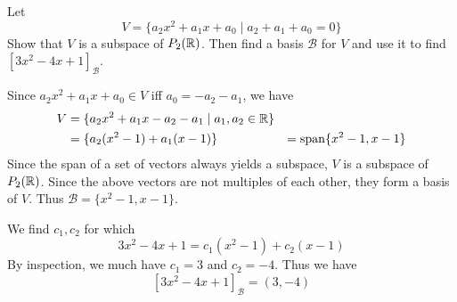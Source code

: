 \documentclass{article}
\DeclareMathOperator{\spn}{span}
\begin{document}
\begin{example}
  Let \[
    V = \{a_2x^2 + a_1x + a_0 \mid a_2 + a_1 + a_0 = 0\}
  \]
  Show that $V$ is a subspace of $P_2(\mathbb{R})$. Then find a basis $\mathcal{B}$ for $V$ and use it to find $[3x^2 - 4x + 1]_\mathcal{B}$.

  Since $a_2x^2 + a_1x + a_0 \in V$ iff $a_0 = -a_2 - a_1$, we have
  \begin{align*}
    V &= \{a_2x^2 + a_1x -a_2 - a_1 \mid a_1, a_2 \in \R\}\\
    &= \{a_2(x^2 - 1) + a_1(x-1)\}
    &= \spn \{x^2 - 1, x-1\}
  \end{align*}
  Since the span of a set of vectors always yields a subspace, $V$ is a subspace of $P_2(\mathbb{R})$. Since the above vectors are not multiples of each other, they form a basis of $V$. Thus $\mathcal{B} = \{x^2-1, x-1\}$.

  We find $c_1, c_2$ for which \[
    3x^2 -4x + 1 = c_1(x^2 - 1) + c_2(x-1)
  \]
  By inspection, we much have $c_1 = 3$ and $c_2 = -4$. Thus we have \[
    [3x^2 - 4x + 1]_\mathcal{B} = (3, -4)
  \]
\end{example}
\end{document}
